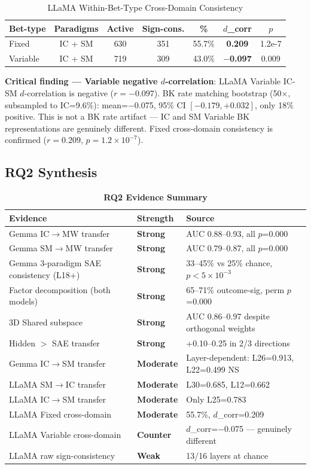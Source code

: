 \documentclass[11pt,a4paper]{article}
\begin{document}
\begin{table}[H]
\centering
\caption{LLaMA Within-Bet-Type Cross-Domain Consistency}\label{tab:t19}
\footnotesize
\begin{tabular}{lcccccc}
\toprule
Bet-type & Paradigms & Active & Sign-cons. & \% & $d$\_corr & $p$ \\
\midrule
Fixed    & IC + SM & 630 & 351 & 55.7\% & \textbf{0.209} & 1.2e-7 \\
Variable & IC + SM & 719 & 309 & 43.0\% & \textbf{$-$0.097} & 0.009 \\
\bottomrule
\end{tabular}
\end{table}

\noindent\textbf{Critical finding --- Variable negative $d$-correlation}: LLaMA Variable IC-SM $d$-correlation is negative ($r=-0.097$). BK rate matching bootstrap (50$\times$, subsampled to IC=9.6\%): mean=$-$0.075, 95\% CI $[-0.179, +0.032]$, only 18\% positive. This is not a BK rate artifact --- IC and SM Variable BK representations are genuinely different. Fixed cross-domain consistency is confirmed ($r=0.209$, $p=1.2\times10^{-7}$).

\subsection{RQ2 Synthesis}

\begin{table}[H]
\centering
\caption*{\textbf{RQ2 Evidence Summary}}
\footnotesize
\begin{tabular}{lll}
\toprule
Evidence & Strength & Source \\
\midrule
Gemma IC$\rightarrow$MW transfer & \textbf{Strong} & AUC 0.88--0.93, all $p$=0.000 \\
Gemma SM$\rightarrow$MW transfer & \textbf{Strong} & AUC 0.79--0.87, all $p$=0.000 \\
Gemma 3-paradigm SAE consistency (L18+) & \textbf{Strong} & 33--45\% vs 25\% chance, $p<5\times10^{-3}$ \\
Factor decomposition (both models) & \textbf{Strong} & 65--71\% outcome-sig, perm $p$=0.000 \\
3D Shared subspace & \textbf{Strong} & AUC 0.86--0.97 despite orthogonal weights \\
Hidden $>$ SAE transfer & \textbf{Strong} & +0.10--0.25 in 2/3 directions \\
Gemma IC$\rightarrow$SM transfer & \textbf{Moderate} & Layer-dependent: L26=0.913, L22=0.499 NS \\
LLaMA SM$\rightarrow$IC transfer & \textbf{Moderate} & L30=0.685, L12=0.662 \\
LLaMA IC$\rightarrow$SM transfer & \textbf{Moderate} & Only L25=0.783 \\
LLaMA Fixed cross-domain & \textbf{Moderate} & 55.7\%, $d$\_corr=0.209 \\
LLaMA Variable cross-domain & \textbf{Counter} & $d$\_corr=$-$0.075 --- genuinely different \\
LLaMA raw sign-consistency & \textbf{Weak} & 13/16 layers at chance \\
\bottomrule
\end{tabular}
\end{table}
\end{document}
